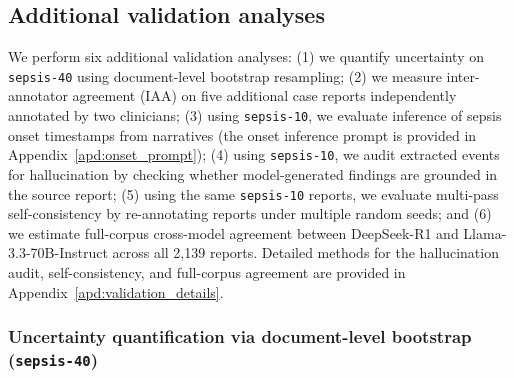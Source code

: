 \documentclass[pmlr,twocolumn,10pt]{jmlr} %
\begin{document}


\subsection{Additional validation analyses}
\label{sec:additional_validation_methods}
We perform six additional validation analyses: (1) we quantify uncertainty on \texttt{sepsis-40} using document-level bootstrap resampling; (2) we measure inter-annotator agreement (IAA) on five additional case reports independently annotated by two clinicians; (3) using \texttt{sepsis-10}, we evaluate inference of sepsis onset timestamps from narratives (the onset inference prompt is provided in Appendix~\ref{apd:onset_prompt}); (4) using \texttt{sepsis-10}, we audit extracted events for hallucination by checking whether model-generated findings are grounded in the source report; (5) using the same \texttt{sepsis-10} reports, we evaluate multi-pass self-consistency by re-annotating reports under multiple random seeds; and (6) we estimate full-corpus cross-model agreement between DeepSeek-R1 and Llama-3.3-70B-Instruct across all 2,139 reports. Detailed methods for the hallucination audit, self-consistency, and full-corpus agreement are provided in Appendix~\ref{apd:validation_details}.

\subsubsection{Uncertainty quantification via document-level bootstrap (\texttt{sepsis-40})}
\label{sec:bootstrap_methods}
\end{document}

